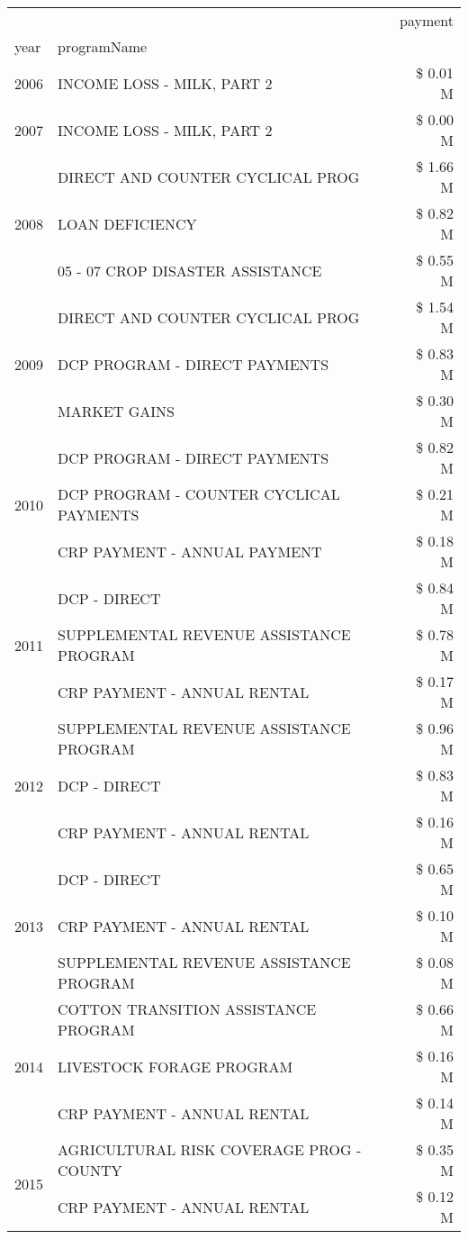\begin{tabular}{llr}
\toprule
 &  & payment \\
year & programName &  \\
\midrule
2006 & INCOME LOSS - MILK, PART 2 & \$ 0.01 M \\
\cline{1-3}
2007 & INCOME LOSS - MILK, PART 2 & \$ 0.00 M \\
\cline{1-3}
\multirow[t]{3}{*}{2008} & DIRECT AND COUNTER CYCLICAL PROG & \$ 1.66 M \\
 & LOAN DEFICIENCY & \$ 0.82 M \\
 & 05 - 07 CROP DISASTER ASSISTANCE & \$ 0.55 M \\
\cline{1-3}
\multirow[t]{3}{*}{2009} & DIRECT AND COUNTER CYCLICAL PROG & \$ 1.54 M \\
 & DCP PROGRAM - DIRECT PAYMENTS & \$ 0.83 M \\
 & MARKET GAINS & \$ 0.30 M \\
\cline{1-3}
\multirow[t]{3}{*}{2010} & DCP PROGRAM - DIRECT PAYMENTS & \$ 0.82 M \\
 & DCP PROGRAM - COUNTER CYCLICAL PAYMENTS & \$ 0.21 M \\
 & CRP PAYMENT - ANNUAL PAYMENT & \$ 0.18 M \\
\cline{1-3}
\multirow[t]{3}{*}{2011} & DCP - DIRECT & \$ 0.84 M \\
 & SUPPLEMENTAL REVENUE ASSISTANCE PROGRAM & \$ 0.78 M \\
 & CRP PAYMENT - ANNUAL RENTAL & \$ 0.17 M \\
\cline{1-3}
\multirow[t]{3}{*}{2012} & SUPPLEMENTAL REVENUE ASSISTANCE PROGRAM & \$ 0.96 M \\
 & DCP - DIRECT & \$ 0.83 M \\
 & CRP PAYMENT - ANNUAL RENTAL & \$ 0.16 M \\
\cline{1-3}
\multirow[t]{3}{*}{2013} & DCP - DIRECT & \$ 0.65 M \\
 & CRP PAYMENT - ANNUAL RENTAL & \$ 0.10 M \\
 & SUPPLEMENTAL REVENUE ASSISTANCE PROGRAM & \$ 0.08 M \\
\cline{1-3}
\multirow[t]{3}{*}{2014} & COTTON TRANSITION ASSISTANCE PROGRAM & \$ 0.66 M \\
 & LIVESTOCK FORAGE PROGRAM & \$ 0.16 M \\
 & CRP PAYMENT - ANNUAL RENTAL & \$ 0.14 M \\
\cline{1-3}
\multirow[t]{3}{*}{2015} & AGRICULTURAL RISK COVERAGE PROG - COUNTY & \$ 0.35 M \\
 & CRP PAYMENT - ANNUAL RENTAL & \$ 0.12 M \\

\end{tabular}
